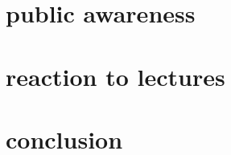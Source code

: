 \documentclass[10pt,a4paper,column]{article}
\begin{document}
\section{public awareness} 
\section{reaction to lectures}
\section{conclusion} 





\end{document}
